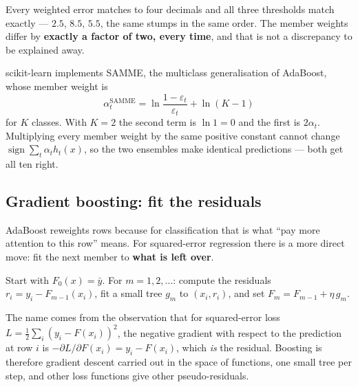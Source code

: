 \documentclass[11pt]{article}
\begin{document}
Every weighted error matches to four decimals and all three thresholds match
exactly --- $2.5$, $8.5$, $5.5$, the same stumps in the same order. The member
weights differ by \textbf{exactly a factor of two, every time}, and that is
not a discrepancy to be explained away.

scikit-learn implements SAMME, the multiclass generalisation of AdaBoost,
whose member weight is
\[
  \alpha_t^{\text{SAMME}}
    = \ln\frac{1 - \varepsilon_t}{\varepsilon_t} + \ln(K - 1)
\]
for $K$ classes. With $K = 2$ the second term is $\ln 1 = 0$ and the first is
$2\alpha_t$. Multiplying every member weight by the same positive constant
cannot change $\operatorname{sign}\sum_t \alpha_t h_t(x)$, so the two
ensembles make identical predictions --- both get all ten right.

\subsection{Gradient boosting: fit the residuals}

AdaBoost reweights rows because for classification that is what ``pay more
attention to this row'' means. For squared-error regression there is a more
direct move: fit the next member to \textbf{what is left over}.

\begin{keyidea}
Start with $F_0(x) = \bar y$. For $m = 1, 2, \dots$: compute the residuals
$r_i = y_i - F_{m-1}(x_i)$, fit a small tree $g_m$ to $(x_i, r_i)$, and set
$F_m = F_{m-1} + \eta\,g_m$.
\end{keyidea}

The name comes from the observation that for squared-error loss
$L = \tfrac12\sum_i (y_i - F(x_i))^2$, the negative gradient with respect to
the prediction at row $i$ is $-\partial L / \partial F(x_i) = y_i - F(x_i)$,
which \emph{is} the residual. Boosting is therefore gradient descent carried
out in the space of functions, one small tree per step, and other loss
functions give other pseudo-residuals.
\end{document}
